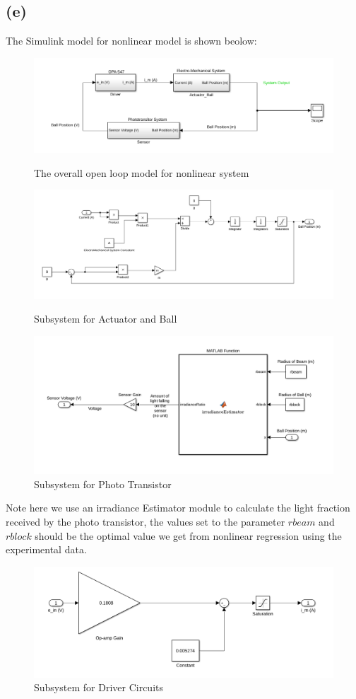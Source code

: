\documentclass[letterpaper]{article}
\begin{document}
\subsection*{(e)}
The Simulink model for nonlinear model is shown beolow:
\begin{figure}[H]
	\centering
	\includegraphics[scale=0.4]{nonlinear_open_loop.png}
	\caption{The overall open loop model for nonlinear system}
	\centering
	\includegraphics[scale=0.3]{nonlinear_actuator_ball.png}
	\caption{Subsystem for Actuator and Ball}
	\centering
	\includegraphics[scale=0.4]{nonlinear_sensor.png}
	\caption{Subsystem for Photo Transistor}
\end{figure}
Note here we use an irradiance Estimator module to calculate the light fraction received by the photo transistor, the values set to the parameter $rbeam$ and $rblock$ should be the optimal value we get from nonlinear regression using the experimental data.
\begin{figure}[H]
	\centering
	\includegraphics[scale=0.4]{nonlinear_driver_circuit.png}
	\caption{Subsystem for Driver Circuits}
\end{figure}
\end{document}
